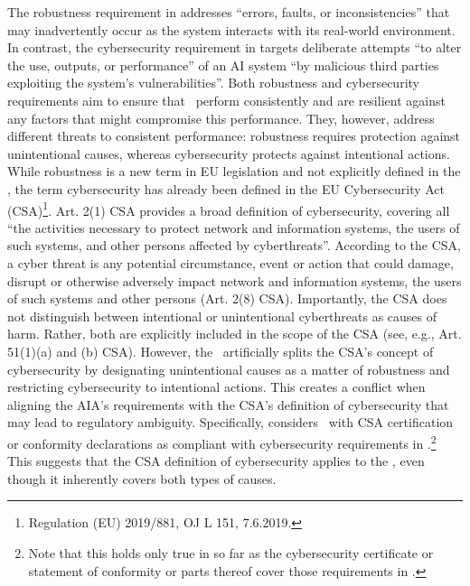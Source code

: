 The robustness requirement in  addresses ``errors, faults, or inconsistencies'' that may inadvertently occur as the system interacts with its real-world environment. 
%
In contrast, the cybersecurity requirement in  targets deliberate attempts ``to alter the use, outputs, or performance'' of an AI system ``by malicious third parties exploiting the system’s vulnerabilities''. 
%
Both robustness and cybersecurity requirements aim to ensure that \HRAIS\ perform consistently and are resilient against any factors that might compromise this performance. They, however, address different threats to consistent performance: robustness requires protection against unintentional causes, whereas cybersecurity protects against intentional actions.
%
While robustness is a new term in EU legislation and not explicitly defined in the \EUAIAct, the term cybersecurity has already been defined in the EU Cybersecurity Act (CSA)\footnote{Regulation (EU) 2019/881, OJ L 151, 7.6.2019.}.
%
Art. 2(1) CSA provides a broad definition of cybersecurity, covering all ``the activities necessary to protect network and information systems, the users of such systems, and other persons affected by cyberthreats''. According to the CSA, a cyber threat is any potential circumstance, event or action that could damage, disrupt or otherwise adversely impact network and information systems, the users of such systems and other persons (Art. 2(8) CSA). Importantly, the CSA does not distinguish between intentional or unintentional cyberthreats as causes of harm. Rather, both are explicitly included in the scope of the CSA (see, e.g., Art. 51(1)(a) and (b) CSA).
%
However, the \EUAIAct\ artificially splits the CSA's concept of cybersecurity by designating unintentional causes as a matter of robustness and restricting cybersecurity to intentional actions. This creates a conflict when aligning the AIA’s requirements with the CSA’s definition of cybersecurity that may lead to regulatory ambiguity. Specifically,  considers \HRAIS\ with CSA certification or conformity declarations as compliant with cybersecurity requirements in .\footnote{Note that this holds only true in so far as the cybersecurity certificate or statement of conformity or parts thereof cover those requirements in .} This suggests that the CSA definition of cybersecurity applies to the \EUAIAct, even though it inherently covers both types of causes.
% 

